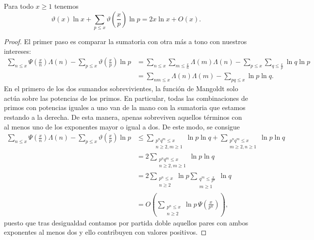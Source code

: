 \begin{lemma}\label{lem20}
Para todo $x \geq 1$ tenemos
\[
\vartheta(x)\ln x + \sum_{p \leq x} \vartheta\left(\frac{x}{p}\right)\ln p = 2x\ln x + O(x).
\]
\end{lemma}

\begin{proof}
El primer paso es comparar la sumatoria con otra m\'as a tono con nuestros intereses: 
\begin{align}
\sum_{n \leq x} \Psi\left(\frac{x}{n}\right)\Lambda(n) - \sum_{p \leq x} \vartheta\left(\frac{x}{p}\right)\ln p
&= \sum_{n \leq x} \sum_{m \leq \frac{x}{n}} \Lambda(m)\Lambda(n) - \sum_{p \leq x} \sum_{q \leq \frac{x}{p}} \ln q \ln p \\
&= \sum_{nm \leq x} \Lambda(n)\Lambda(m) - \sum_{pq \leq x} \ln p \ln q.
\end{align}
En el primero de los dos sumandos sobrevivientes, la funci\'on de Mangoldt solo act\'ua sobre las potencias de los primos. 
En particular, todas las combinaciones de primos con potencias iguales a uno van de la mano con la sumatoria que estamos restando a la derecha.
De esta manera, apenas sobreviven aquellos t\'erminos 
con al menos uno de los exponentes mayor o igual a dos. 
De este modo, se consigue 
\begin{align}
\sum_{n \leq x} \Psi\left(\frac{x}{n}\right)\Lambda(n) - \sum_{p \leq x} \vartheta\left(\frac{x}{p}\right)\ln p & \le 
\sum_{\substack{p^n q^m \leq x \\ n \geq 2, m \geq 1}} \ln p \ln q  + 
\sum_{\substack{p^n q^m \leq x \\ m \geq 2, n \geq 1}} \ln p \ln q \\
& = 2 \sum_{\substack{p^n q^m \leq x \\ n \geq 2, m \geq 1}} \ln p \ln q \\
& = 2 \sum_{\substack{p^n \leq x \\ n \geq 2}} \ln p \sum_{\substack{q^m \leq \frac{x}{p^n} \\ m \geq 1}} \ln q  \\
& = O\left(\sum_{\substack{p^n \leq x \\ n \geq 2}} \ln p \, \Psi\left(\frac{x}{p^n}\right)\right), 
\end{align}
puesto que tras desigualdad contamos por partida doble aquellos pares con ambos exponentes al menos dos y ello contribuyen con valores positivos. 

\end{proof}
